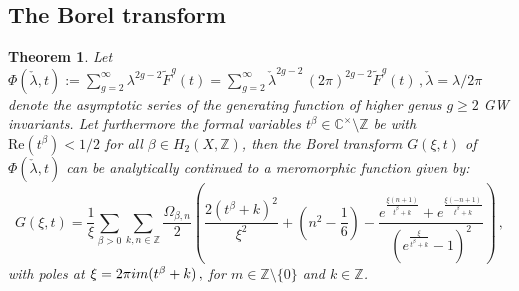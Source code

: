 \documentclass[a4paper,12pt,justification=centering]{article}
\numberwithin{equation}{section}
\newcommand{\ii}{\textnormal{i}}
\theoremstyle{plain}%
\newtheorem{thm}{Theorem}[section]
\theoremstyle{definition}
\begin{document}
\subsection{The Borel transform}\label{boreltransproof}

\begin{thm} \label{thm:Borel}
Let $\Phi(\check{\lambda},t):= \sum_{g=2}^{\infty} \lambda^{2g-2} \tilde{F}^g(t)=  \sum_{g=2}^{\infty} \check{\lambda}^{2g-2} \, (2\pi)^{2g-2} \tilde{F}^g(t)\,, \check{\lambda}=\lambda/2\pi$ denote the asymptotic series of the generating function of  higher genus $g \ge 2$ GW invariants. Let furthermore the formal variables $t^{\beta} \in \mathbb{C}^{\times}\setminus \mathbb{Z}$ be with $\textrm{Re}(t^\beta) <1/2$ for all $\beta \in H_2(X,\mathbb{Z})$, then the Borel transform $G(\xi,t)$ of $\Phi(\check{\lambda},t)$  can be analytically continued to a meromorphic function given by:
\begin{equation} \label{eq:BorelTransform}
G(\xi,t) 
=  \frac{1}{\xi} \sum_{\beta>0} \sum_{k,n\in \mathbb{Z}} \frac{\Omega_{\beta, n}}{2}
\left(
  \frac{2(t^{\beta}+k)^2}{\xi^2}
  + \left(n^2 - \frac{1}{6}\right)
  - \frac{
      e^{\frac{\xi(n+1)}{t^{\beta}+k}}
      + e^{\frac{\xi(-n+1)}{t^{\beta}+k}}
    }{
       \left( e^{\frac{\xi}{t^{\beta}+k}} - 1 \right)^2
    } 
\right)\,,
\end{equation}
with poles at $\xi= 2\pi \ii m  (t^\beta+k)\,,$ for $m\in \mathbb{Z}\setminus \{0\}$ and $k\in \mathbb{Z}$.
\end{thm}
\end{document}
